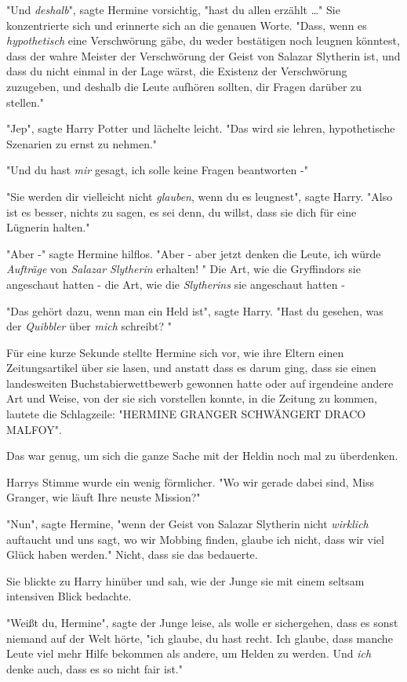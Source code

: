 {"Und \emph{deshalb}", sagte Hermine vorsichtig, "hast du allen erzählt …" Sie konzentrierte sich und erinnerte sich an die genauen Worte. "Dass, wenn es \emph{hypothetisch} eine Verschwörung gäbe, du weder bestätigen noch leugnen könntest, dass der wahre Meister der Verschwörung der Geist von Salazar Slytherin ist, und dass du nicht einmal in der Lage wärst, die Existenz der Verschwörung zuzugeben, und deshalb die Leute aufhören sollten, dir Fragen darüber zu stellen."

"Jep", sagte Harry Potter und lächelte leicht. "Das wird sie lehren, hypothetische Szenarien zu ernst zu nehmen."

"Und du hast \emph{mir} gesagt, ich solle keine Fragen beantworten -"

"Sie werden dir vielleicht nicht \emph{glauben}, wenn du es leugnest", sagte Harry. "Also ist es besser, nichts zu sagen, es sei denn, du willst, dass sie dich für eine Lügnerin halten."

"Aber -" sagte Hermine hilflos. "Aber - aber jetzt denken die Leute, ich würde \emph{Aufträge} von \emph{Salazar Slytherin} erhalten! " Die Art, wie die Gryffindors sie angeschaut hatten - die Art, wie die \emph{Slytherins} sie angeschaut hatten -

"Das gehört dazu, wenn man ein Held ist", sagte Harry. "Hast du gesehen, was der \emph{Quibbler} über \emph{mich} schreibt? "

Für eine kurze Sekunde stellte Hermine sich vor, wie ihre Eltern einen Zeitungsartikel über sie lasen, und anstatt dass es darum ging, dass sie einen landesweiten Buchstabierwettbewerb gewonnen hatte oder auf irgendeine andere Art und Weise, von der sie sich vorstellen konnte, in die Zeitung zu kommen, lautete die Schlagzeile: "HERMINE GRANGER SCHWÄNGERT DRACO MALFOY".

Das war genug, um sich die ganze Sache mit der Heldin noch mal zu überdenken.

Harrys Stimme wurde ein wenig förmlicher. "Wo wir gerade dabei sind, Miss Granger, wie läuft Ihre neuste Mission?"

"Nun", sagte Hermine, "wenn der Geist von Salazar Slytherin nicht \emph{wirklich} auftaucht und uns sagt, wo wir Mobbing finden, glaube ich nicht, dass wir viel Glück haben werden." Nicht, dass sie das bedauerte.

Sie blickte zu Harry hinüber und sah, wie der Junge sie mit einem seltsam intensiven Blick bedachte.

"Weißt du, Hermine", sagte der Junge leise, als wolle er sichergehen, dass es sonst niemand auf der Welt hörte, "ich glaube, du hast recht. Ich glaube, dass manche Leute viel mehr Hilfe bekommen als andere, um Helden zu werden. Und \emph{ich} denke auch, dass es so nicht fair ist."

}
